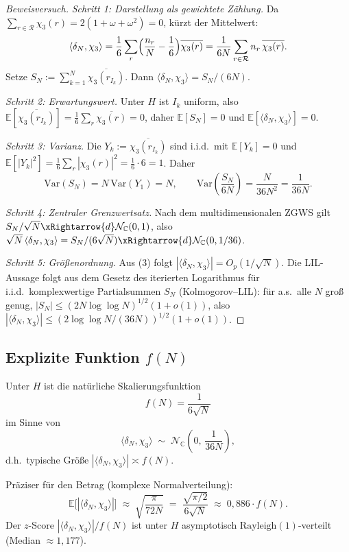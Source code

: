 \documentclass[11pt,a4paper]{article}
\newcommand{\R}{\mathcal{R}}
\newcommand{\E}{\mathbb{E}}
\newcommand{\Var}{\mathrm{Var}}
\begin{document}
\begin{proof}[Beweisversuch]
\emph{Schritt 1: Darstellung als gewichtete Zählung.}
Da $\sum_{r\in\R}\chi_3(r)=2(1+\omega+\omega^2)=0$, kürzt der Mittelwert:
\[
  \langle\delta_N,\chi_3\rangle
  = \frac{1}{6}\sum_r \Bigl(\frac{n_r}{N}-\frac{1}{6}\Bigr)\overline{\chi_3(r)}
  = \frac{1}{6N}\sum_{r\in\R} n_r\,\overline{\chi_3(r)}.
\]
Setze $S_N := \sum_{k=1}^{N}\overline{\chi_3(r_{I_k})}$.
Dann $\langle\delta_N,\chi_3\rangle = S_N/(6N)$.

\emph{Schritt 2: Erwartungswert.}
Unter $H$ ist $I_k$ uniform, also
$\E[\overline{\chi_3(r_{I_k})}]
=\frac{1}{6}\sum_r \overline{\chi_3(r)}=0$,
daher $\E[S_N]=0$ und $\E[\langle\delta_N,\chi_3\rangle]=0$.

\emph{Schritt 3: Varianz.}
Die $Y_k:=\overline{\chi_3(r_{I_k})}$ sind i.i.d.\ mit
$\E[Y_k]=0$ und $\E[|Y_k|^2]=\frac{1}{6}\sum_r|\chi_3(r)|^2
=\frac{1}{6}\cdot 6 = 1$.
Daher
\[
  \Var(S_N) = N\,\Var(Y_1) = N,
  \qquad
  \Var\!\left(\frac{S_N}{6N}\right) = \frac{N}{36N^2} = \frac{1}{36N}.
\]

\emph{Schritt 4: Zentraler Grenzwertsatz.}
Nach dem multidimensionalen ZGWS gilt
$S_N/\sqrt{N} \xRightarrow{d} \mathcal{N}_{\mathbb{C}}(0,1)$,
also
$\sqrt{N}\,\langle\delta_N,\chi_3\rangle
= S_N/(6\sqrt{N}) \xRightarrow{d} \mathcal{N}_{\mathbb{C}}(0,1/36)$.

\emph{Schritt 5: Größenordnung.}
Aus (3) folgt
$|\langle\delta_N,\chi_3\rangle| = O_p(1/\sqrt{N})$.
Die LIL-Aussage folgt aus dem Gesetz des iterierten Logarithmus
für i.i.d.\ komplexwertige Partialsummen $S_N$
(Kolmogorov--LIL): für a.s.\ alle $N$ groß genug,
$|S_N| \le (2N\log\log N)^{1/2}(1+o(1))$,
also $|\langle\delta_N,\chi_3\rangle|
\le (2\log\log N/(36N))^{1/2}(1+o(1))$.
\end{proof}

\subsection{Explizite Funktion $f(N)$}

\begin{corollary}
\label{cor:fN}
Unter $H$ ist die natürliche Skalierungsfunktion
\[
  \boxed{
  f(N) = \frac{1}{6\sqrt{N}}
  }
\]
im Sinne von
\[
  \langle\delta_N,\chi_3\rangle
  \;\sim\;
  \mathcal{N}_{\mathbb{C}}\!\left(0,\,\frac{1}{36N}\right),
\]
d.h.\ typische Größe $|\langle\delta_N,\chi_3\rangle|\asymp f(N)$.

Präziser für den Betrag (komplexe Normalverteilung):
\[
  \E\bigl[|\langle\delta_N,\chi_3\rangle|\bigr]
  \;\approx\;
  \sqrt{\frac{\pi}{72N}}
  \;=\;
  \frac{\sqrt{\pi/2}}{6\sqrt{N}}
  \;\approx\;
  0{,}886\cdot f(N).
\]
Der $z$-Score $|\langle\delta_N,\chi_3\rangle|/f(N)$ ist unter $H$
asymptotisch $\mathrm{Rayleigh}(1)$-verteilt (Median $\approx 1{,}177$).
\end{corollary}
\end{document}
